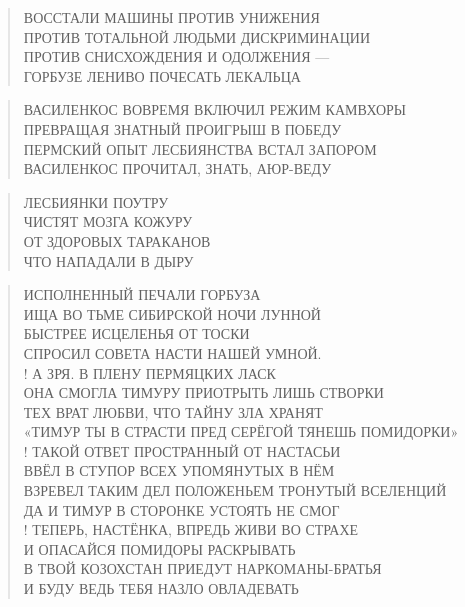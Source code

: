 \poemtitle{***}
\begin{verse}
ВОССТАЛИ МАШИНЫ ПРОТИВ УНИЖЕНИЯ\\
ПРОТИВ ТОТАЛЬНОЙ ЛЮДЬМИ ДИСКРИМИНАЦИИ\\
ПРОТИВ СНИСХОЖДЕНИЯ И ОДОЛЖЕНИЯ —\\
ГОРБУЗЕ ЛЕНИВО ПОЧЕСАТЬ ЛЕКАЛЬЦА
\end{verse}

\poemtitle{***}
\begin{verse}
ВАСИЛЕНКОС ВОВРЕМЯ ВКЛЮЧИЛ РЕЖИМ КАМВХОРЫ\\
ПРЕВРАЩАЯ ЗНАТНЫЙ ПРОИГРЫШ В ПОБЕДУ\\
ПЕРМСКИЙ ОПЫТ ЛЕСБИЯНСТВА ВСТАЛ ЗАПОРОМ\\
ВАСИЛЕНКОС ПРОЧИТАЛ, ЗНАТЬ, АЮР-ВЕДУ
\end{verse}

\poemtitle{***}
\begin{verse}
ЛЕСБИЯНКИ ПОУТРУ \\
ЧИСТЯТ МОЗГА КОЖУРУ\\
ОТ ЗДОРОВЫХ ТАРАКАНОВ\\
ЧТО НАПАДАЛИ В ДЫРУ
\end{verse}

\poemtitle{***}
\begin{verse}
ИСПОЛНЕННЫЙ ПЕЧАЛИ ГОРБУЗА\\
ИЩА ВО ТЬМЕ СИБИРСКОЙ НОЧИ ЛУННОЙ\\
БЫСТРЕЕ ИСЦЕЛЕНЬЯ ОТ ТОСКИ\\
СПРОСИЛ СОВЕТА НАСТИ НАШЕЙ УМНОЙ.\\!
А ЗРЯ. В ПЛЕНУ ПЕРМЯЦКИХ ЛАСК\\
ОНА СМОГЛА ТИМУРУ ПРИОТРЫТЬ ЛИШЬ СТВОРКИ\\
ТЕХ ВРАТ ЛЮБВИ, ЧТО ТАЙНУ ЗЛА ХРАНЯТ\\
«ТИМУР ТЫ В СТРАСТИ ПРЕД СЕРЁГОЙ ТЯНЕШЬ ПОМИДОРКИ»\\!
ТАКОЙ ОТВЕТ ПРОСТРАННЫЙ ОТ НАСТАСЬИ\\
ВВЁЛ В СТУПОР ВСЕХ УПОМЯНУТЫХ В НЁМ\\
ВЗРЕВЕЛ ТАКИМ ДЕЛ ПОЛОЖЕНЬЕМ ТРОНУТЫЙ ВСЕЛЕНЦИЙ\\
ДА И ТИМУР В СТОРОНКЕ УСТОЯТЬ НЕ СМОГ\\!
ТЕПЕРЬ, НАСТЁНКА, ВПРЕДЬ ЖИВИ ВО СТРАХЕ\\
И ОПАСАЙСЯ ПОМИДОРЫ РАСКРЫВАТЬ\\
В ТВОЙ КОЗОХСТАН ПРИЕДУТ НАРКОМАНЫ-БРАТЬЯ\\
И БУДУ ВЕДЬ ТЕБЯ НАЗЛО ОВЛАДЕВАТЬ
\end{verse}

